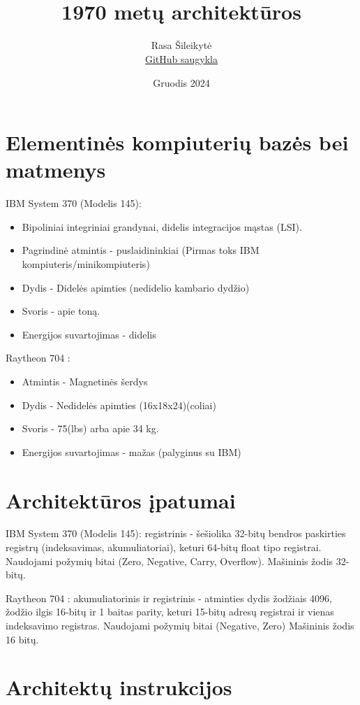 \documentclass{article}
\title{\bold{IBM System 370 vs. Raytheon 704} \\1970 metų architektūros}
\author{Rasa Šileikytė \\\href{https://github.com/RasaSil/IBM-System-370-vs.-Raytheon-704}{GitHub saugykla}}
\date{Gruodis 2024}
\begin{document}
\maketitle
\section*{Elementinės kompiuterių bazės bei matmenys}
\begin{multicols}{2}
IBM System 370 (Modelis 145):
\begin{itemize}
\item Bipoliniai integriniai grandynai, didelis integracijos mąstas (LSI).
\item Pagrindinė atmintis - puslaidininkiai (Pirmas toks IBM kompiuteris/minikompiuteris)
\item Dydis - Didelės apimties (nedidelio kambario dydžio)
\item Svoris - apie toną.
\item Energijos suvartojimas - didelis
\end{itemize}

\columnbreak

Raytheon 704 :
\begin{itemize}
\item Atmintis - Magnetinės šerdys
\item Dydis - Nedidelės apimties (16x18x24)(coliai)
\item Svoris - 75(lbs) arba apie 34 kg.
\item Energijos suvartojimas - mažas (palyginus su IBM)
\end{itemize}
\end{multicols}
\section*{Architektūros įpatumai}
\begin{multicols}{2}
IBM System 370 (Modelis 145): registrinis - šešiolika 32-bitų bendros paskirties registrų (indeksavimas, akumuliatoriai), keturi 64-bitų float tipo registrai. Naudojami požymių bitai (Zero, Negative, Carry, Overflow). Mašininis žodis 32-bitų.

\columnbreak
Raytheon 704 : akumuliatorinis ir registrinis - atminties dydis žodžiais 4096, žodžio ilgis 16-bitų ir 1 baitas parity, keturi 15-bitų adresų registrai ir vienas indeksavimo registras. Naudojami požymių bitai (Negative, Zero) Mašininis žodis 16 bitų.
\end{multicols}

\section*{Architektų instrukcijos}
\end{document}
